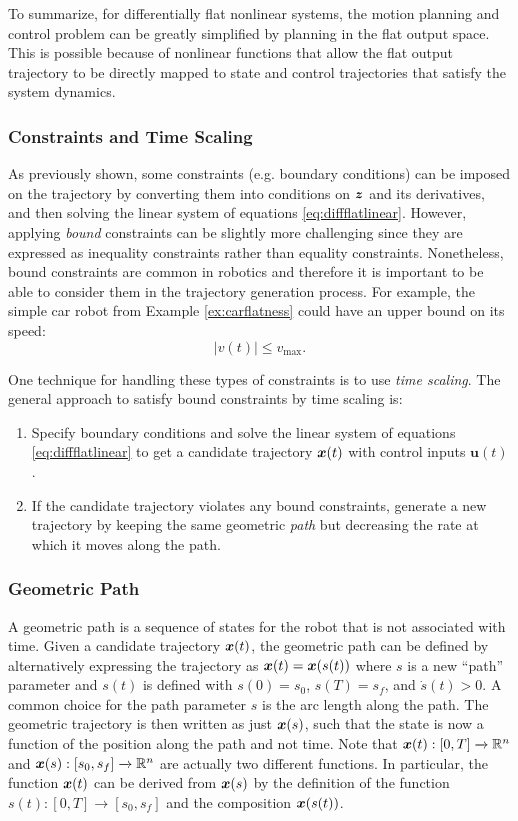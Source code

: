To summarize, for differentially flat nonlinear systems, the motion planning and control problem can be greatly simplified by planning in the flat output space. This is possible because of nonlinear functions that allow the flat output trajectory to be directly mapped to state and control trajectories that satisfy the system dynamics.


\subsubsection{Constraints and Time Scaling}
As previously shown, some constraints (e.g. boundary conditions) can be imposed on the trajectory by converting them into conditions on $\bm{z}$ and its derivatives, and then solving the linear system of equations \eqref{eq:diffflatlinear}. However, applying \textit{bound} constraints can be slightly more challenging since they are expressed as inequality constraints rather than equality constraints. Nonetheless, bound constraints are common in robotics and therefore it is important to be able to consider them in the trajectory generation process. For example, the simple car robot from Example \ref{ex:carflatness} could have an upper bound on its speed: 
\begin{equation*}
|v(t)| \leq v_\text{max}.
\end{equation*}

One technique for handling these types of constraints is to use \textit{time scaling}. The general approach to satisfy bound constraints by time scaling is:
\begin{enumerate}
    \item Specify boundary conditions and solve the linear system of equations \eqref{eq:diffflatlinear} to get a candidate trajectory $\bm{x}(t)$ with control inputs $\bm{u}(t)$.
    \item If the candidate trajectory violates any bound constraints, generate a new trajectory by keeping the same geometric \textit{path} but decreasing the rate at which it moves along the path.
\end{enumerate}

\subsubsection{Geometric Path}
A geometric path is a sequence of states for the robot that is not associated with time. Given a candidate trajectory $\bm{x}(t)$, the geometric path can be defined by alternatively expressing the trajectory as $\bm{x}(t) = \bm{x}(s(t))$ where $s$ is a new ``path'' parameter and $s(t)$ is defined with $s(0) = s_0$, $s(T) = s_f$, and $\dot{s}(t) > 0$. A common choice for the path parameter $s$ is the arc length along the path. The geometric trajectory is then written as just $\bm{x}(s)$, such that the state is now a function of the position along the path and not time. Note that $\bm{x}(t): [0,T] \xrightarrow{} \mathbb{R}^n$ and $\bm{x}(s): [s_0, s_f] \xrightarrow{} \mathbb{R}^n$ are actually two different functions. In particular, the function $\bm{x}(t)$ can be derived from $\bm{x}(s)$ by the definition of the function $s(t): [0,T] \xrightarrow{} [s_0, s_f]$ and the composition $\bm{x}(s(t))$.

